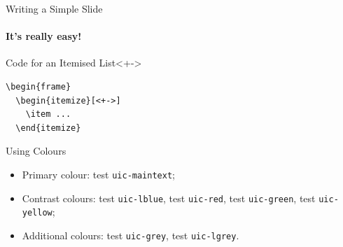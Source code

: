 \documentclass{uic-beamer}
\newcommand{\testcolor}[1]{\colorbox{#1}{\textcolor{#1}{test}} \texttt{#1}}
\begin{document}




\begin{frame}[fragile]{Writing a Simple Slide}
\framesubtitle{It's really easy!}
\begin{block}{Code for an Itemised List}<+->
\begin{verbatim}
\begin{frame}
  \begin{itemize}[<+->]
    \item ...
  \end{itemize}\end{verbatim}
\end{block}
\end{frame}

\begin{frame}[fragile]{Using Colours}
  \begin{itemize}
  \item Primary colour: \testcolor{uic-maintext};
  \item Contrast colours: \testcolor{uic-lblue}, \testcolor{uic-red}, 
                          \testcolor{uic-green}, \testcolor{uic-yellow};
  \item Additional colours: \testcolor{uic-grey}, \testcolor{uic-lgrey}.
  \end{itemize}
\end{frame}
\end{document}
